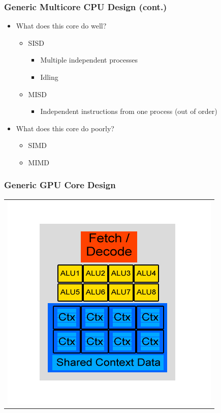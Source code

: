 \documentclass{beamer}
\begin{document}
\begin{frame}
	\frametitle{Generic Multicore CPU Design (cont.)}
	\begin{itemize}
		\item What does this core do well?
		\begin{itemize}
			\item SISD
			\begin{itemize}
				\item Multiple independent processes
				\item Idling
			\end{itemize}
			\item MISD
			\begin{itemize}
				\item Independent instructions from one process (out of order)
			\end{itemize}
		\end{itemize}
		\item What does this core do poorly?
		\begin{itemize}
			\item SIMD
			\item MIMD
		\end{itemize}
	\end{itemize}
\end{frame}

\begin{frame}
	\frametitle{Generic GPU Core Design}
	\begin{tabular}{c}
		\includegraphics[width=.75\textwidth]{GPU-Design.jpg}
	\end{tabular}
\end{frame}
\end{document}
